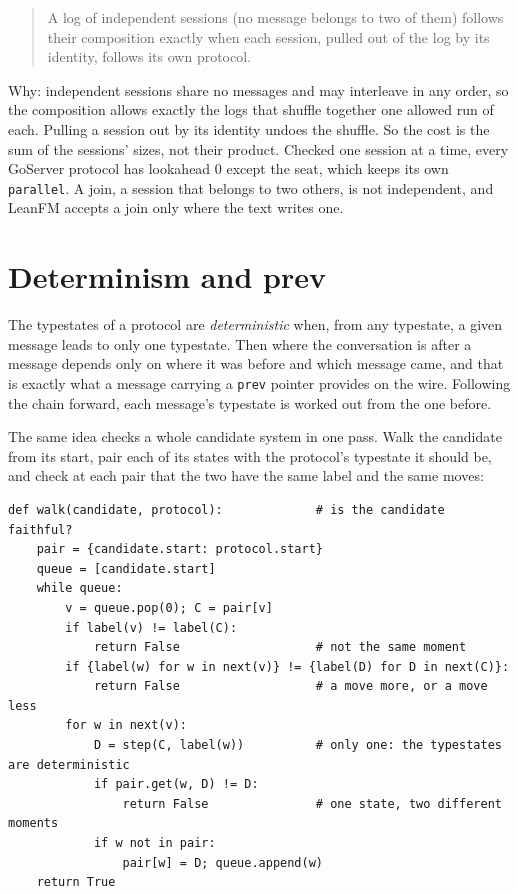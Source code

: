 \begin{quote}
A log of independent sessions (no message belongs to two of them) follows their
composition exactly when each session, pulled out of the log by its identity, follows its
own protocol.
\end{quote}

Why: independent sessions share no messages and may interleave in any order, so the
composition allows exactly the logs that shuffle together one allowed run of each.
Pulling a session out by its identity undoes the shuffle. So the cost is the sum of the
sessions' sizes, not their product. Checked one session at a time, every GoServer
protocol has lookahead $0$ except the seat, which keeps its own \texttt{parallel}. A join,
a session that belongs to two others, is not independent, and LeanFM accepts a join only
where the text writes one.

\section{Determinism and prev}\label{def:det}\label{thm:walk}

The typestates of a protocol are \emph{deterministic} when, from any typestate, a given
message leads to only one typestate. Then where the conversation is after a message
depends only on where it was before and which message came, and that is exactly what a
message carrying a \texttt{prev} pointer provides on the wire. Following the chain forward,
each message's typestate is worked out from the one before.

The same idea checks a whole candidate system in one pass. Walk the candidate from its
start, pair each of its states with the protocol's typestate it should be, and check at
each pair that the two have the same label and the same moves:

\begin{lstlisting}[language={},basicstyle=\ttfamily\footnotesize]
def walk(candidate, protocol):             # is the candidate faithful?
    pair = {candidate.start: protocol.start}
    queue = [candidate.start]
    while queue:
        v = queue.pop(0); C = pair[v]
        if label(v) != label(C):
            return False                   # not the same moment
        if {label(w) for w in next(v)} != {label(D) for D in next(C)}:
            return False                   # a move more, or a move less
        for w in next(v):
            D = step(C, label(w))          # only one: the typestates are deterministic
            if pair.get(w, D) != D:
                return False               # one state, two different moments
            if w not in pair:
                pair[w] = D; queue.append(w)
    return True
\end{lstlisting}


